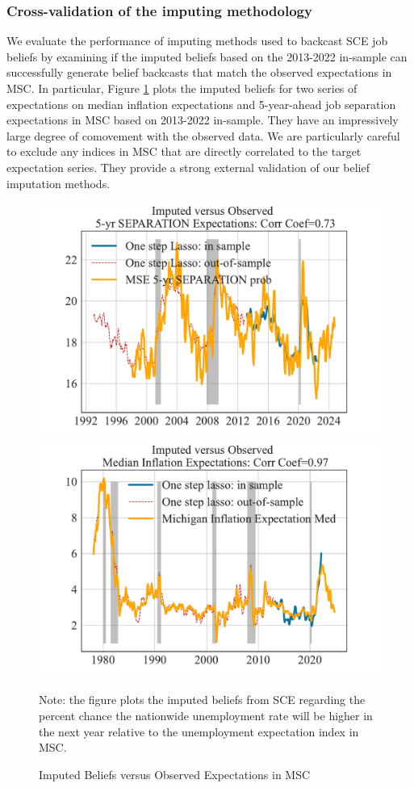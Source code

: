 \subsubsection{Cross-validation of the imputing methodology}

We evaluate the performance of imputing methods used to backcast SCE job beliefs by examining if the imputed beliefs based on the 2013-2022 in-sample can successfully generate belief backcasts that match the observed expectations in MSC. In particular, Figure \ref{fig:impute_cv_with_msc_separation_inflation} plots the imputed beliefs for two series of expectations on median inflation expectations and 5-year-ahead job separation expectations in MSC based on 2013-2022 in-sample. They have an impressively large degree of comovement with the observed data. We are particularly careful to exclude any indices in MSC that are directly correlated to the target expectation series. They provide a strong external validation of our belief imputation methods. 

 \begin{figure}[ht]
    	\caption{Imputed Beliefs versus Observed Expectations in MSC}
    	\label{fig:impute_cv_with_msc_separation_inflation}
    	\begin{center}
\includegraphics[width=0.49\linewidth]{text/Chapter2/Figures/imputed_comparison_separation_5y_prob_msc_1step.pdf}  \includegraphics[width=0.49\linewidth]{text/Chapter2/Figures/imputed_comparison_inflation_msc_1step.pdf}  
    	\end{center}
    	
    	\begin{flushleft}Note: the figure plots the imputed beliefs from SCE regarding the percent chance the nationwide unemployment rate will be higher in the next year relative to the unemployment expectation index in MSC.\end{flushleft}
    \end{figure}




